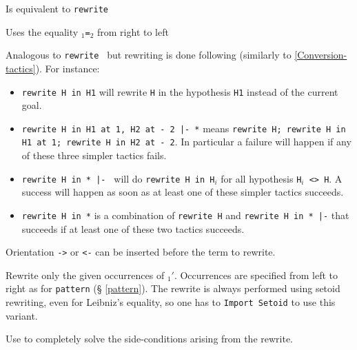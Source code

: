 \begin{Variants}
\item {}

  Is equivalent to {\tt rewrite \term}

\item {}

  Uses the equality \term$_1${\tt=}\term$_2$ from right to left

\item {}

  Analogous to {\tt rewrite {\term}} but rewriting is done following
   (similarly to \ref{Conversion-tactics}). For
  instance:
  \begin{itemize}
  \item \texttt{rewrite H in H1} will rewrite \texttt{H} in the hypothesis
    \texttt{H1} instead of the current goal.
  \item \texttt{rewrite H in H1 at 1, H2 at - 2 |- *} means \texttt{rewrite H; rewrite H in H1 at 1;
      rewrite H in H2 at - 2}. In particular a failure will happen if any of
    these three simpler tactics fails.
  \item \texttt{rewrite H in * |- } will do \texttt{rewrite H in
      H$_i$} for all hypothesis \texttt{H$_i$ <> H}. A success will happen
    as soon as at least one of these simpler tactics succeeds.
  \item \texttt{rewrite H in *} is a combination of \texttt{rewrite H}
    and \texttt{rewrite H in * |-} that succeeds if at
    least one of these two tactics succeeds.
  \end{itemize}
  Orientation {\tt ->} or {\tt <-} can be
  inserted before the term to rewrite.

\item {}

  Rewrite only the given occurrences of \term$_1'$. Occurrences are
  specified from left to right as for \texttt{pattern} (\S
  \ref{pattern}). The rewrite is always performed using setoid
  rewriting, even for Leibniz's equality, so one has to
  \texttt{Import Setoid} to use this variant.

\item {}

  Use {\tac} to completely solve the side-conditions arising from the
  rewrite.


\end{Variants}
